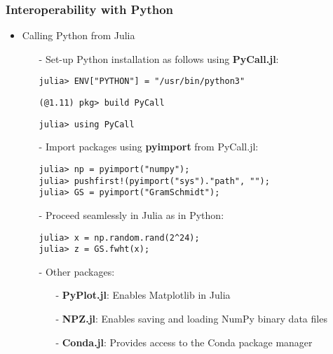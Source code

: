 \documentclass[t,usepdftitle=false]{beamer}
\begin{document}
\begin{frame}[fragile]
\frametitle{Interoperability with Python}
\begin{itemize}
\item Calling Python from Julia
\begin{itemize}\normalsize
\item[-] Set-up Python installation as follows using \textbf{PyCall.jl}:
\begin{verbatim}
julia> ENV["PYTHON"] = "/usr/bin/python3"
\end{verbatim}
\begin{verbatim}
(@1.11) pkg> build PyCall
\end{verbatim}
\begin{verbatim}
julia> using PyCall
\end{verbatim}
\item[-] Import packages using \textbf{pyimport} from PyCall.jl:
\begin{verbatim}
julia> np = pyimport("numpy");
julia> pushfirst!(pyimport("sys")."path", ""); 
julia> GS = pyimport("GramSchmidt");          
\end{verbatim}
\item[-] Proceed seamlessly in Julia as in Python:
\begin{verbatim}
julia> x = np.random.rand(2^24);
julia> z = GS.fwht(x);
\end{verbatim}
\item[-] Other packages:
\begin{itemize}\normalsize
\item[-] \textbf{PyPlot.jl}: Enables Matplotlib in Julia
\item[-] \textbf{NPZ.jl}: Enables saving and loading NumPy binary data files
\item[-] \textbf{Conda.jl}: Provides access to the Conda package manager
\end{itemize}
\end{itemize}
\end{itemize}
\end{frame}  
\end{document}
